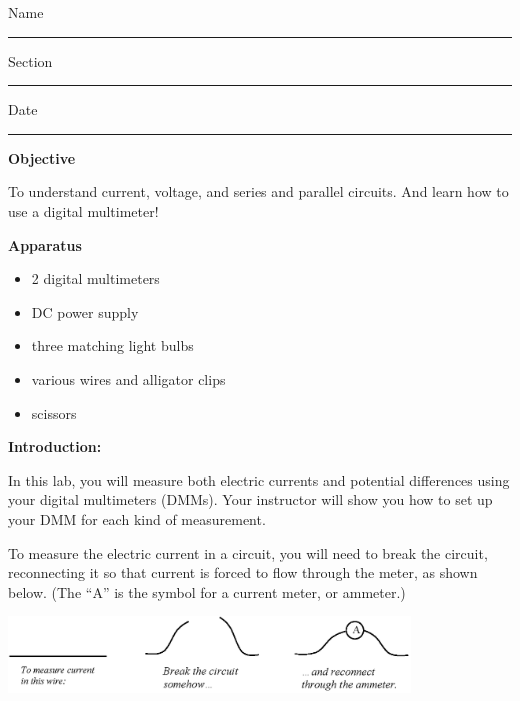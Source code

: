 Name \rule{2.0in}{0.1pt}\hfill{}Section \rule{1.0in}{0.1pt}\hfill{}Date
\rule{1.0in}{0.1pt}

\textbf{Objective}

To understand current, voltage, and series and parallel circuits.  And learn how to use a digital multimeter!

\textbf{Apparatus}

\begin{itemize} \itemsep1pt
\item 2 digital multimeters 
\item DC power supply 
\item three matching light bulbs 
\item various wires and alligator clips
\item scissors
\end{itemize}

\textbf{Introduction:}

In this lab, you will measure both electric currents and potential differences using your digital multimeters (DMMs).  Your instructor will show you how to set up your DMM for each kind of measurement.

To measure the electric current in a circuit, you will need to break the circuit, reconnecting it so that current is forced to flow through the meter, as shown below.  (The ``A'' is the symbol for a current meter, or ammeter.)

\begin{center}
\includegraphics[width=0.8\textwidth]{electric_circuits/how_to_measure_current.eps}
\end{center}
\vspace{-0.1in}

